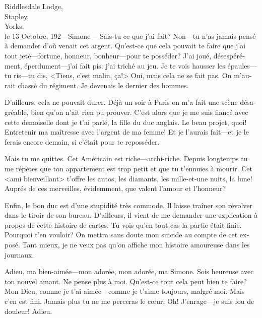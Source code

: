 \begin{french}
\begin{mail}{Riddlesdale Lodge,\\Stapley,\\ Yorks.\\le 13 Octobre, 192—}{Simone---}
Sais-tu ce que j'ai fait? Non—tu n'as jamais pensé à demander d'où venait cet argent. Qu'est-ce que cela pouvait te faire que j'ai tout jeté—fortune, honneur, bonheur—pour te posséder? J'ai joué, désespérément, éperdument—j'ai fait pis: j'ai triché au jeu. Je te vois hausser les épaules—tu ris—tu dis, <Tiens, c'est malin, ça!> Oui, mais cela ne se fait pas. On m'aurait chassé du régiment. Je devenais le dernier des hommes.

D'ailleurs, cela ne pouvait durer. Déjà un soir à Paris on m'a fait une scène désagréable, bien qu'on n'ait rien pu prouver. C'est alors que je me suis fiancé avec cette demoiselle dont je t'ai parlé, la fille du duc anglais. Le beau projet, quoi! Entretenir ma maîtresse avec l'argent de ma femme! Et je l'aurais fait—et je le ferais encore demain, si c'était pour te reposséder.

Mais tu me quittes. Cet Américain est riche—archi-riche. Depuis longtemps tu me répètes que ton appartement est trop petit et que tu t'ennuies à mourir. Cet <ami bienveillant> t'offre les autos, les diamants, les mille-et-une nuits, la lune! Auprés de ces merveilles, évidemment, que valent l'amour et l'honneur?

Enfin, le bon duc est d'une stupidité très commode. Il laisse traîner son révolver dans le tiroir de son bureau. D'ailleurs, il vient de me demander une explication à propos de cette histoire de cartes. Tu vois qu'en tout cas la partie était finie. Pourquoi t'en vouloir? On mettra sans doute mon suicide au compte de cet exposé. Tant mieux, je ne veux pas qu'on affiche mon histoire amoureuse dans les journaux.

Adieu, ma bien-aimée—mon adorée, mon adorée, ma Simone. Sois heureuse avec ton nouvel amant. Ne pense plus à moi. Qu'est-ce tout cela peut bien te faire? Mon Dieu, comme je t'ai aimée—comme je t'aime toujours, malgré moi. Mais c'en est fini. Jamais plus tu ne me perceras le cœur. Oh! J'enrage—je suis fou de douleur! Adieu.

	\begin{letter}
		\vspace{-0.5em}
	\end{letter}

	\end{mail}
\end{french}


\begin{a4}
	\clearpage
\end{a4}


